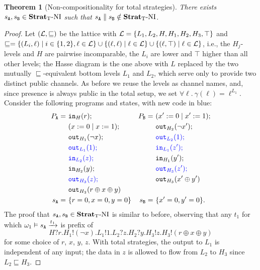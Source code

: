 \documentclass[preprint,5p,twocolumn]{elsarticle}
\newtheorem{theorem}{Theorem}
\begin{document}
\begin{theorem}[Non-compositionality for total strategies]
  \label{thm:noncompositional total}
  There exists $s_{\mathtt{A}},s_{\mathtt{B}} \in \mathbf{Strat}_{\mathrm{T}}\text{-}\mathrm{NI}$ such that $s_{\mathtt{A}} \parallel s_{\mathtt{B}} \notin \mathbf{Strat}_{\mathrm{T}}\text{-}\mathrm{NI}$.
\end{theorem}
\begin{proof}
  Let $(\mathcal{L}, \sqsubseteq)$ be the lattice with $\mathcal{L} = \lbrace L_1, L_2, H, H_1, H_2, H_3, \top \rbrace$
  and $\sqsubseteq = \lbrace (L_i, \ell) \mid i \in \{1,2\},\ell \in \mathcal{L}\rbrace \cup \lbrace (\ell, \ell) \mid \ell \in \mathcal{L}\rbrace
  \cup \lbrace (\ell, \top) \mid \ell \in \mathcal{L}\rbrace$, i.e.,
  the $H_j$-levels and $H$ are pairwise incomparable, the $L_i$ are lower and $\top$ higher than all
  other levels; the Hasse diagram is the one above with $L$ replaced by the two mutually
  $\sqsubseteq$-equivalent bottom levels $L_1$ and $L_2$, which serve only to provide two distinct
  public channels. As before we reuse the levels as channel names, and, since presence is always
  public in the total setup, we set $\forall \ell.~\gamma(\ell) = \ell^{L_1}$.
  Consider the following programs and states, with new code in blue:
  \begin{align*}
    P_{\mathtt{A}} =~& \mathtt{in}_{H}(r); & P_{\mathtt{B}} =~ & (x' := 0 \mid x' := 1); \\
          &(x := 0 \mid x := 1); && \mathtt{out}_{H_2}(\neg x');\\
          &\mathtt{out}_{H_1}(\neg x); && {\color{blue} \mathtt{out}_{L_2}(1);} \\
          &{\color{blue}\mathtt{out}_{L_1}(1);} && {\color{blue}\mathtt{in}_{L_1}(z');} \\
          &{\color{blue}\mathtt{in}_{L_2}(z);} && \mathtt{in}_{H_1}(y'); \\
          &\mathtt{in}_{H_2}(y); && {\color{blue}\mathtt{out}_{H_3}(z');}\\
          &{\color{blue}\mathtt{out}_{H_3}(z);} && \mathtt{out}_{H_3}(x' \oplus y') \\
          &\mathtt{out}_{H_3}(r \oplus x \oplus y) \\
    s_{\mathtt{A}} =~& \lbrace r = 0, x = 0, y = 0\rbrace & s_{\mathtt{B}} =~& \lbrace x' = 0, y' = 0\rbrace.
  \end{align*}
  The proof that $s_{\mathtt{A}},s_{\mathtt{B}} \in \mathbf{Strat}_{\mathrm{T}}\text{-}\mathrm{NI}$ is similar to before, observing that any $t_1$ for
  which $\omega_1 \vDash s_{\mathtt{A}} \xrightarrow{t_1}$ is prefix of
  $$H?r.H_1!(\neg x).L_1!1.L_2?z.H_2?y.H_3!z.H_3!(r \oplus x \oplus y)$$
  for some choice of $r$, $x$, $y$, $z$. With total strategies, the output to $L_1$ is
  independent of any input; the data in $z$ is allowed to flow from $L_2$ to $H_3$
  since $L_2 \sqsubseteq H_3$.


\end{proof}
\end{document}
